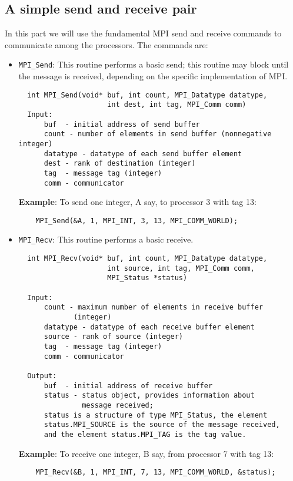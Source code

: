 \documentclass[12pt]{article}
\begin{document}
\subsection*{A simple send and receive pair}
In this part we will use the fundamental MPI send and receive commands 
to communicate among the processors. The commands are: 
\begin{itemize}
  \item \texttt{MPI\_Send}: 
  This routine performs a basic send; this routine may block until 
  the message
  is received, depending on the specific implementation of MPI.
  \begin{verbatim}  
  int MPI_Send(void* buf, int count, MPI_Datatype datatype,
                     int dest, int tag, MPI_Comm comm)
  Input:
      buf  - initial address of send buffer
      count - number of elements in send buffer (nonnegative integer)
      datatype - datatype of each send buffer element
      dest - rank of destination (integer)
      tag  - message tag (integer)
      comm - communicator
  \end{verbatim} 
  \textbf{Example}: To send one integer, A say, to processor 3 with tag 13:
  \begin{verbatim}
    MPI_Send(&A, 1, MPI_INT, 3, 13, MPI_COMM_WORLD);  
  \end{verbatim}
  \item \texttt{MPI\_Recv}:
    This routine performs a basic receive.
  \begin{verbatim}
  int MPI_Recv(void* buf, int count, MPI_Datatype datatype,
                     int source, int tag, MPI_Comm comm,
                     MPI_Status *status)

  Input:
      count - maximum number of elements in receive buffer
             (integer)
      datatype - datatype of each receive buffer element
      source - rank of source (integer)
      tag  - message tag (integer)
      comm - communicator
                     
  Output:
      buf  - initial address of receive buffer
      status - status object, provides information about
               message received;
      status is a structure of type MPI_Status, the element
      status.MPI_SOURCE is the source of the message received,
      and the element status.MPI_TAG is the tag value.

  \end{verbatim}
  \textbf{Example}: To receive one integer, B say, from processor 7 
  with tag 13:
  \begin{verbatim}
    MPI_Recv(&B, 1, MPI_INT, 7, 13, MPI_COMM_WORLD, &status);  
  \end{verbatim}
\end{itemize} 
\end{document}

